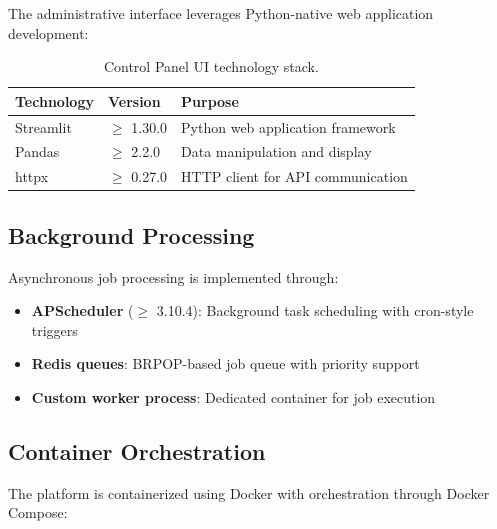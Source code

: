 The administrative interface leverages Python-native web application development:

\begin{table}[ht]
\centering
\caption{Control Panel UI technology stack.}
\label{tab:ui-control-stack}
\small
\begin{tabular}{lll}
\hline
\textbf{Technology} & \textbf{Version} & \textbf{Purpose} \\
\hline
Streamlit & $\geq$ 1.30.0 & Python web application framework \\
Pandas & $\geq$ 2.2.0 & Data manipulation and display \\
httpx & $\geq$ 0.27.0 & HTTP client for API communication \\
\hline
\end{tabular}
\end{table}

\subsection{Background Processing}

Asynchronous job processing is implemented through:

\begin{itemize}
    \item \textbf{APScheduler} ($\geq$ 3.10.4): Background task scheduling with cron-style triggers
    \item \textbf{Redis queues}: BRPOP-based job queue with priority support
    \item \textbf{Custom worker process}: Dedicated container for job execution
\end{itemize}

\subsection{Container Orchestration}

The platform is containerized using Docker with orchestration through Docker Compose:

